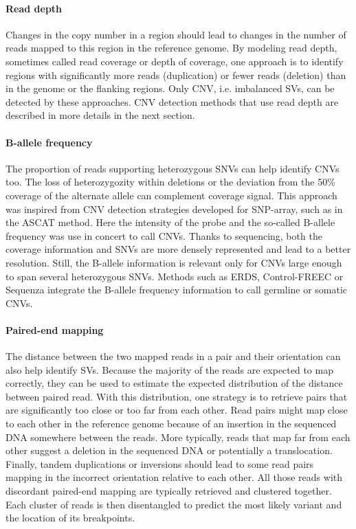 \paragraph{Read depth}
Changes in the copy number in a region should lead to changes in the number of reads mapped to this region in the reference genome.
By modeling read depth, sometimes called read coverage or depth of coverage, one approach is to identify regions with significantly more reads (duplication) or fewer reads (deletion) than in the genome or the flanking regions.
Only CNV, i.e. imbalanced SVs, can be detected by these approaches.
CNV detection methods that use read depth are described in more details in the next section.

\paragraph{B-allele frequency}
The proportion of reads supporting heterozygous SNVs can help identify CNVs too.
The loss of heterozygozity within deletions or the deviation from the 50\% coverage of the alternate allele can complement coverage signal.
This approach was inspired from CNV detection strategies developed for SNP-array, such as in the {\sf ASCAT} method\cite{VanLoo2010}.
Here the intensity of the probe and the so-called B-allele frequency was use in concert to call CNVs.
Thanks to sequencing, both the coverage information and SNVs are more densely represented and lead to a better resolution.
Still, the B-allele information is relevant only for CNVs large enough to span several heterozygous SNVs.
Methods such as {\sf ERDS}\cite{Zhu2012}, \textsf{Control-FREEC}\cite{Boeva2012} or \textsf{Sequenza}\cite{Favero2015} integrate the B-allele frequency information to call germline or somatic CNVs.

\paragraph{Paired-end mapping}
The distance between the two mapped reads in a pair and their orientation can also help identify SVs.
Because the majority of the reads are expected to map correctly, they can be used to estimate the expected distribution of the distance between paired read.
With this distribution, one strategy is to retrieve pairs that are significantly too close or too far from each other.
Read pairs might map close to each other in the reference genome because of an insertion in the sequenced DNA somewhere between the reads.
More typically, reads that map far from each other suggest a deletion in the sequenced DNA or potentially a translocation.
Finally, tandem duplications or inversions should lead to some read pairs mapping in the incorrect orientation relative to each other.
All those reads with discordant paired-end mapping are typically retrieved and clustered together.
Each cluster of reads is then disentangled to predict the most likely variant and the location of its breakpoints.


